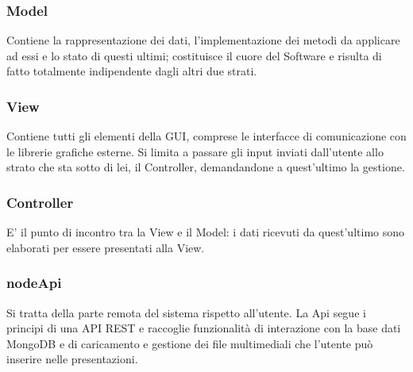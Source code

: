 {{	\subsubsection{Model}{
		Contiene la rappresentazione dei dati, l'implementazione dei metodi da applicare ad essi e lo stato di questi ultimi; costituisce il cuore del Software e risulta di fatto totalmente indipendente dagli altri due strati.
		}
	\subsubsection{View}{	
		Contiene tutti gli elementi della GUI, comprese le interfacce di comunicazione con le librerie grafiche esterne. Si limita a passare gli input inviati dall'utente allo strato che sta sotto di lei, il Controller, demandandone a quest'ultimo la	gestione.
		}
	\subsubsection{Controller}{
		E' il punto di incontro tra la View e il Model: i dati ricevuti da quest’ultimo sono elaborati per essere presentati alla View.
		}
	\subsubsection{nodeApi}{
		Si tratta della parte remota del sistema rispetto all'utente. La Api segue i principi di una API REST e raccoglie funzionalit\`{a} di interazione con la base dati MongoDB e di caricamento e gestione dei file multimediali che l'utente pu\`{o} inserire nelle presentazioni.
		}
	}

}